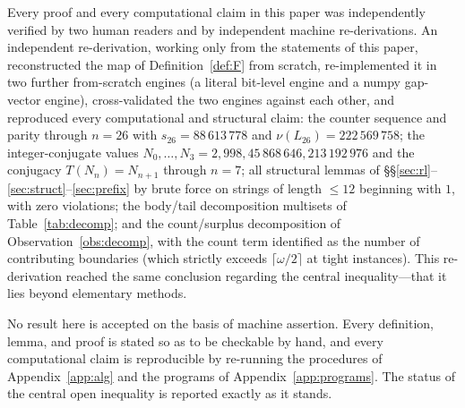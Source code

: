 \documentclass[11pt,reqno]{amsart}
\theoremstyle{plain}
\theoremstyle{definition}
\theoremstyle{remark}
\begin{document}
Every proof and every computational claim in this paper was independently verified by two human readers and by independent machine re-derivations. An independent re-derivation, working only from the statements of this paper, reconstructed the map of Definition~\ref{def:F} from scratch, re-implemented it in two further from-scratch engines (a literal bit-level engine and a numpy gap-vector engine), cross-validated the two engines against each other, and reproduced every computational and structural claim: the counter sequence and parity through $n=26$ with $s_{26}=88\,613\,778$ and $\nu(L_{26})=222\,569\,758$; the integer-conjugate values $N_0,\dots,N_3=2,998,45\,868\,646,213\,192\,976$ and the conjugacy $T(N_n)=N_{n+1}$ through $n=7$; all structural lemmas of \S\S\ref{sec:rl}--\ref{sec:struct}--\ref{sec:prefix} by brute force on strings of length $\le 12$ beginning with $1$, with zero violations; the body/tail decomposition multisets of Table~\ref{tab:decomp}; and the count/surplus decomposition of Observation~\ref{obs:decomp}, with the count term identified as the number of contributing boundaries (which strictly exceeds $\lceil\omega/2\rceil$ at tight instances). This re-derivation reached the same conclusion regarding the central inequality---that it lies beyond elementary methods.

No result here is accepted on the basis of machine assertion. Every definition, lemma, and proof is stated so as to be checkable by hand, and every computational claim is reproducible by re-running the procedures of Appendix~\ref{app:alg} and the programs of Appendix~\ref{app:programs}. The status of the central open inequality is reported exactly as it stands.
\end{document}
